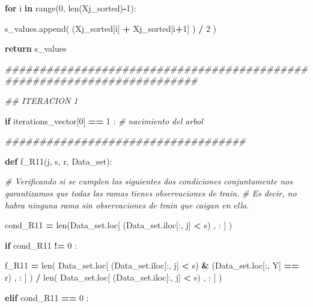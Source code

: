 \documentclass[
  11pt,
  a4paper,
]{article}
\newenvironment{Shaded}{\begin{snugshade}}{\end{snugshade}}
\newcommand{\BuiltInTok}[1]{#1}
\newcommand{\CommentTok}[1]{\textcolor[rgb]{0.56,0.35,0.01}{\textit{#1}}}
\newcommand{\ControlFlowTok}[1]{\textcolor[rgb]{0.13,0.29,0.53}{\textbf{#1}}}
\newcommand{\DecValTok}[1]{\textcolor[rgb]{0.00,0.00,0.81}{#1}}
\newcommand{\KeywordTok}[1]{\textcolor[rgb]{0.13,0.29,0.53}{\textbf{#1}}}
\newcommand{\NormalTok}[1]{#1}
\newcommand{\OperatorTok}[1]{\textcolor[rgb]{0.81,0.36,0.00}{\textbf{#1}}}
\newcommand{\StringTok}[1]{\textcolor[rgb]{0.31,0.60,0.02}{#1}}
\begin{document}
\begin{Shaded}
\begin{Highlighting}[]
        
            \ControlFlowTok{for}\NormalTok{ i }\KeywordTok{in} \BuiltInTok{range}\NormalTok{(}\DecValTok{0}\NormalTok{, }\BuiltInTok{len}\NormalTok{(Xj\_sorted)}\OperatorTok{{-}}\DecValTok{1}\NormalTok{):}

\NormalTok{                s\_values.append( (Xj\_sorted[i] }\OperatorTok{+}\NormalTok{ Xj\_sorted[i}\OperatorTok{+}\DecValTok{1}\NormalTok{] ) }\OperatorTok{/} \DecValTok{2}\NormalTok{  )}

    
        \ControlFlowTok{return}\NormalTok{ s\_values}


\CommentTok{\#\#\#\#\#\#\#\#\#\#\#\#\#\#\#\#\#\#\#\#\#\#\#\#\#\#\#\#\#\#\#\#\#\#\#\#\#\#\#\#\#\#\#\#\#\#\#\#\#\#\#\#\#\#\#\#\#\#\#\#\#\#\#\#\#\#\#\#\#\#\#\#  }

   \CommentTok{\#\# ITERACION 1}

    \ControlFlowTok{if}\NormalTok{ iterations\_vector[}\DecValTok{0}\NormalTok{] }\OperatorTok{==} \DecValTok{1}\NormalTok{ : }\CommentTok{\# nacimiento del arbol}

        
        \CommentTok{\#\#\#\#\#\#\#\#\#\#\#\#\#\#\#\#\#\#\#\#\#\#\#\#\#\#\#\#\#\#\#\#\#\#\#}
        
        \KeywordTok{def}\NormalTok{ f\_R11(j, s, r, Data\_set):}

           \CommentTok{\# Verificando si se cumplen las siguientes dos condiciones conjuntamente nos garantizamos que todas las ramas tienes observaciones de train. }
           \CommentTok{\# Es decir, no habra ninguna rama sin observaciones de train que caigan en ella.}

\NormalTok{            cond\_R11 }\OperatorTok{=} \BuiltInTok{len}\NormalTok{(Data\_set.loc[ (Data\_set.iloc[:, j] }\OperatorTok{\textless{}}\NormalTok{ s) , : ] )}

            \ControlFlowTok{if}\NormalTok{  cond\_R11 }\OperatorTok{!=} \DecValTok{0}\NormalTok{ :}

\NormalTok{                f\_R11 }\OperatorTok{=} \BuiltInTok{len}\NormalTok{( Data\_set.loc[ (Data\_set.iloc[:, j] }\OperatorTok{\textless{}}\NormalTok{ s) }\OperatorTok{\&}\NormalTok{ (Data\_set.loc[:, }\StringTok{\textquotesingle{}Y\textquotesingle{}}\NormalTok{] }\OperatorTok{==}\NormalTok{ r) , : ] ) }\OperatorTok{/} \BuiltInTok{len}\NormalTok{( Data\_set.loc[ (Data\_set.iloc[:, j] }\OperatorTok{\textless{}}\NormalTok{ s) , : ] )}

            
            \ControlFlowTok{elif}\NormalTok{ cond\_R11 }\OperatorTok{==} \DecValTok{0}\NormalTok{ :}


\end{Highlighting}
\end{Shaded}
\end{document}
